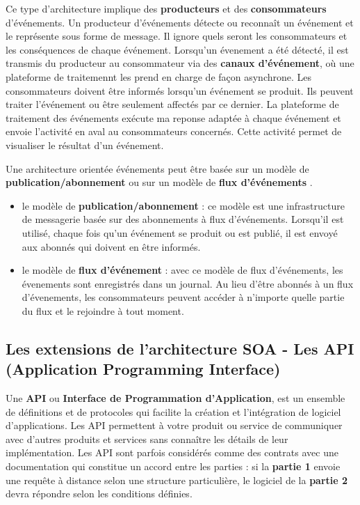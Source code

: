 \documentclass[
]{book}
\theoremstyle{definition}
\theoremstyle{definition}
\theoremstyle{definition}
\theoremstyle{definition}
\theoremstyle{remark}
\begin{document}
Ce type d'architecture implique des \textbf{producteurs} et des \textbf{consommateurs} d'événements. Un producteur d'événements détecte ou reconnaît un événement et le représente sous forme de message. Il ignore quels seront les consommateurs et les conséquences de chaque événement.
Lorsqu'un évenement a été détecté, il est transmis du producteur au consommateur via des \textbf{canaux d'événement}, où une plateforme de traitemennt les prend en charge de façon asynchrone. Les consommateurs doivent être informés lorsqu'un événement se produit. Ils peuvent traiter l'événement ou être seulement affectés par ce dernier.
La plateforme de traitement des événements exécute ma reponse adaptée à chaque événement et envoie l'activité en aval au consommateurs concernés. Cette activité permet de visualiser le résultat d'un événement.

Une architecture orientée événements peut être basée sur un modèle de \textbf{publication/abonnement} ou sur un modèle de \textbf{flux d'événements} .

\begin{itemize}
\item
  le modèle de \textbf{publication/abonnement} : ce modèle est une infrastructure de messagerie basée sur des abonnements à flux d'événements. Lorsqu'il est utilisé, chaque fois qu'un événement se produit ou est publié, il est envoyé aux abonnés qui doivent en être informés.
\item
  le modèle de \textbf{flux d'événement} : avec ce modèle de flux d'événements, les évenements sont enregistrés dans un journal. Au lieu d'être abonnés à un flux d'évenements, les consommateurs peuvent accéder à n'importe quelle partie du flux et le rejoindre à tout moment.
\end{itemize}

\hypertarget{les-extensions-de-larchitecture-soa---les-api-application-programming-interface}{%
\subsection{Les extensions de l'architecture SOA - Les API (Application Programming Interface)}\label{les-extensions-de-larchitecture-soa---les-api-application-programming-interface}}

Une \textbf{API} ou \textbf{Interface de Programmation d'Application}, est un ensemble de définitions et de protocoles qui facilite la création et l'intégration de logiciel d'applications.
Les API permettent à votre produit ou service de communiquer avec d'autres produits et services sans connaître les détails de leur implémentation.
Les API sont parfois considérés comme des contrats avec une documentation qui constitue un accord entre les parties : si la \textbf{partie 1} envoie une requête à distance selon une structure particulière, le logiciel de la \textbf{partie 2} devra répondre selon les conditions définies.
\end{document}

